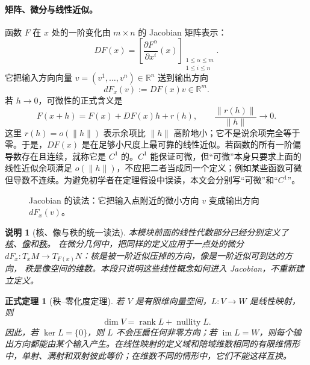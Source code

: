 \documentclass[UTF8,fontset=none,a4paper,11pt]{ctexart}
\theoremstyle{foundation-definition}
\theoremstyle{foundation-theorem}
\newtheorem{theorem}[definition]{正式定理}
\theoremstyle{foundation-proposition}
\theoremstyle{foundation-example}
\theoremstyle{foundation-remark}
\newtheorem{remark}[definition]{说明}
\theoremstyle{foundation-theorem}
\newcommand{\term}[2]{\hyperref[#1]{#2}}
\begin{document}
\paragraph{矩阵、微分与线性近似。}
函数 \(F\) 在 \(x\) 处的一阶变化由 \(m\times n\) 的 Jacobian 矩阵表示：
\[
DF(x)=
\left[
\frac{\partial F^\alpha}{\partial x^i}(x)
\right]_{\substack{1\leq\alpha\leq m\\1\leq i\leq n}}.
\]
它把输入方向向量 \(v=(v^1,\ldots,v^n)\in\mathbb R^n\) 送到输出方向
\[
dF_x(v):=DF(x)v\in\mathbb R^m.
\]
若 \(h\to0\)，可微性的正式含义是
\[
F(x+h)=F(x)+DF(x)h+r(h),
\qquad
\frac{\|r(h)\|}{\|h\|}\longrightarrow0.
\]
这里 \(r(h)=o(\|h\|)\) 表示余项比 \(\|h\|\) 高阶地小；它不是说余项完全等于零。于是，\(DF(x)\) 是在足够小尺度上最可靠的线性近似。若函数的所有一阶偏导数存在且连续，就称它是 \(C^1\) 的。\(C^1\) 能保证可微，但“可微”本身只要求上面的线性近似余项满足 \(o(\|h\|)\)，不应把二者当成同一个定义；例如某些函数可微但导数不连续。为避免初学者在定理假设中误读，本文会分别写“可微”和“\(C^1\)”。

\begin{figure}[htbp]
\centering
{}
\caption{Jacobian 的读法：它把输入点附近的微小方向 \(v\) 变成输出方向 \(dF_x(v)\)。}
\label{fig:jacobian-map}
\end{figure}

\begin{remark}[核、像与秩的统一读法]\label{rem:kernel-image-rank-recall}
本模块前面的线性代数部分已经分别定义了
\term{def:linear-kernel}{核}、\term{def:linear-image}{像}和\term{def:linear-rank}{秩}。
在微分几何中，把同样的定义应用于一点处的微分
\(dF_x:T_xM\to T_{F(x)}N\)：核是被一阶近似压掉的方向，像是一阶近似可到达的方向，
秩是像空间的维数。本段只说明这些线性概念如何进入 Jacobian，不重新建立定义。
\end{remark}

\begin{theorem}[秩--零化度定理]
若 \(V\) 是有限维向量空间，\(L:V\to W\) 是线性映射，则
\[
\dim V=\operatorname{rank}L+\operatorname{nullity}L.
\]
因此，若 \(\ker L=\{0\}\)，则 \(L\) 不会压扁任何非零方向；若 \(\operatorname{im}L=W\)，则每个输出方向都能由某个输入产生。在线性映射的定义域和陪域维数相同的有限维情形中，单射、满射和双射彼此等价；在维数不同的情形中，它们不能这样互换。
\end{theorem}
\end{document}
